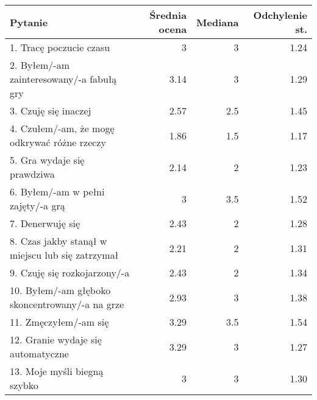 \begin{table}[h!]
    \begin{center}
        \begin{tabular}{|m{10em}|r|r|r|}
            \hline
            Pytanie                                                           & Średnia ocena & Mediana & Odchylenie st. \\
            \hline
            1. Tracę poczucie czasu                                           & 3             & 3       & 1.24           \\
            2. Byłem/-am \newline zainteresowany/-a fabułą gry                & 3.14          & 3       & 1.29           \\
            3. Czuję się inaczej                                              & 2.57          & 2.5     & 1.45           \\
            4. Czułem/-am, że mogę odkrywać różne rzeczy                      & 1.86          & 1.5     & 1.17           \\
            5. Gra wydaje się prawdziwa                                       & 2.14          & 2       & 1.23           \\
            6. Byłem/-am \newline w pełni zajęty/-a grą                       & 3             & 3.5     & 1.52           \\
            7. Denerwuję się                                                  & 2.43          & 2       & 1.28           \\
            8. Czas jakby stanął w miejscu lub się zatrzymał                  & 2.21          & 2       & 1.31           \\
            9. Czuję się \newline rozkojarzony/-a                             & 2.43          & 2       & 1.34           \\
            10. Byłem/-am głęboko \newline skoncentrowany/-a \newline na grze & 2.93          & 3       & 1.38           \\
            11. Zmęczyłem/-am się                                             & 3.29          & 3.5     & 1.54           \\
            12. Granie wydaje się automatyczne                                & 3.29          & 3       & 1.27           \\
            13. Moje myśli \newline biegną szybko                             & 3             & 3       & 1.30           \\

\end{tabular}
\end{center}
\end{table}
